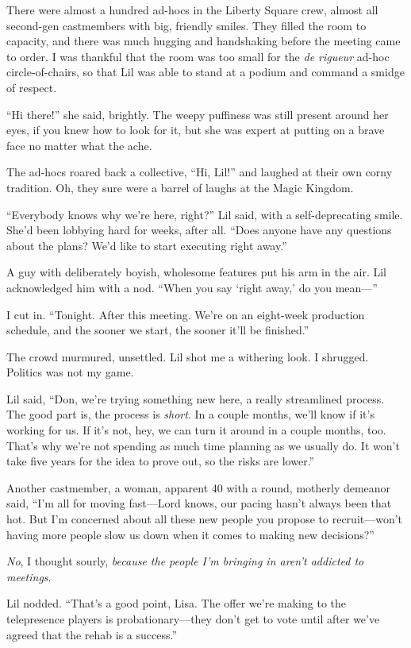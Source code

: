 There were almost a hundred ad-hocs in the Liberty Square crew,
almost all second-gen castmembers with big, friendly smiles. They
filled the room to capacity, and there was much hugging and
handshaking before the meeting came to order. I was thankful that
the room was too small for the \emph{de rigueur} ad-hoc
circle-of-chairs, so that Lil was able to stand at a podium and
command a smidge of respect.

“Hi there!” she said, brightly. The weepy puffiness was still
present around her eyes, if you knew how to look for it, but she
was expert at putting on a brave face no matter what the ache.

The ad-hocs roared back a collective, “Hi, Lil!” and laughed at
their own corny tradition. Oh, they sure were a barrel of laughs at
the Magic Kingdom.

“Everybody knows why we're here, right?” Lil said, with a
self-deprecating smile. She'd been lobbying hard for weeks, after
all. “Does anyone have any questions about the plans? We'd like to
start executing right away.”

A guy with deliberately boyish, wholesome features put his arm in
the air. Lil acknowledged him with a nod. “When you say ‘right
away,’ do you mean—”

I cut in. “Tonight. After this meeting. We're on an eight-week
production schedule, and the sooner we start, the sooner it'll be
finished.”

The crowd murmured, unsettled. Lil shot me a withering look. I
shrugged. Politics was not my game.

Lil said, “Don, we're trying something new here, a really
streamlined process. The good part is, the process is \emph{short}.
In a couple months, we'll know if it's working for us. If it's not,
hey, we can turn it around in a couple months, too. That's why
we're not spending as much time planning as we usually do. It won't
take five years for the idea to prove out, so the risks are
lower.”

Another castmember, a woman, apparent 40 with a round, motherly
demeanor said, “I'm all for moving fast—Lord knows, our pacing
hasn't always been that hot. But I'm concerned about all these new
people you propose to recruit—won't having more people slow us down
when it comes to making new decisions?”

\emph{No}, I thought sourly,
\emph{because the people I'm bringing in aren't addicted to meetings}.

Lil nodded. “That's a good point, Lisa. The offer we're making to
the telepresence players is probationary—they don't get to vote
until after we've agreed that the rehab is a success.”

